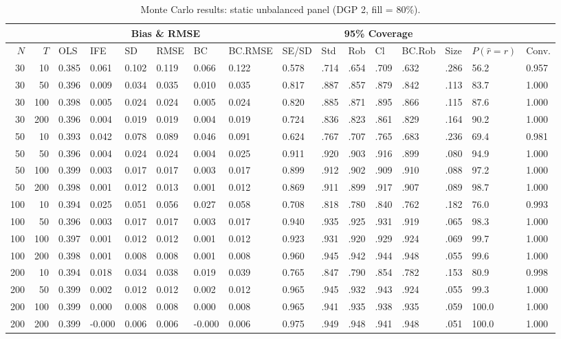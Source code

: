 \begin{table}[ht]
\centering
\caption{Monte Carlo results: static unbalanced panel (DGP 2, fill = 80\%).} 
\label{tab:mc_static_unb_f80}
\begin{tabular}{rrllllllllllllll}
  \hline
 & & \multicolumn{6}{c}{Bias \& RMSE} & & \multicolumn{4}{c}{95\% Coverage} & & & \\
\cline{3-8}\cline{10-13}
 \hline
$N$ & $T$ & OLS & IFE & SD & RMSE & BC & BC.RMSE & SE/SD & Std & Rob & Cl & BC.Rob & Size & $P(\hat r=r)$ & Conv. \\ 
  \hline
30 & 10 & 0.385 & 0.061 & 0.102 & 0.119 & 0.066 & 0.122 & 0.578 & .714 & .654 & .709 & .632 & .286 & 56.2 & 0.957 \\ 
  30 & 50 & 0.396 & 0.009 & 0.034 & 0.035 & 0.010 & 0.035 & 0.817 & .887 & .857 & .879 & .842 & .113 & 83.7 & 1.000 \\ 
  30 & 100 & 0.398 & 0.005 & 0.024 & 0.024 & 0.005 & 0.024 & 0.820 & .885 & .871 & .895 & .866 & .115 & 87.6 & 1.000 \\ 
  30 & 200 & 0.396 & 0.004 & 0.019 & 0.019 & 0.004 & 0.019 & 0.724 & .836 & .823 & .861 & .829 & .164 & 90.2 & 1.000 \\ 
  50 & 10 & 0.393 & 0.042 & 0.078 & 0.089 & 0.046 & 0.091 & 0.624 & .767 & .707 & .765 & .683 & .236 & 69.4 & 0.981 \\ 
  50 & 50 & 0.396 & 0.004 & 0.024 & 0.024 & 0.004 & 0.025 & 0.911 & .920 & .903 & .916 & .899 & .080 & 94.9 & 1.000 \\ 
  50 & 100 & 0.399 & 0.003 & 0.017 & 0.017 & 0.003 & 0.017 & 0.899 & .912 & .902 & .909 & .910 & .088 & 97.2 & 1.000 \\ 
  50 & 200 & 0.398 & 0.001 & 0.012 & 0.013 & 0.001 & 0.012 & 0.869 & .911 & .899 & .917 & .907 & .089 & 98.7 & 1.000 \\ 
  100 & 10 & 0.394 & 0.025 & 0.051 & 0.056 & 0.027 & 0.058 & 0.708 & .818 & .780 & .840 & .762 & .182 & 76.0 & 0.993 \\ 
  100 & 50 & 0.396 & 0.003 & 0.017 & 0.017 & 0.003 & 0.017 & 0.940 & .935 & .925 & .931 & .919 & .065 & 98.3 & 1.000 \\ 
  100 & 100 & 0.397 & 0.001 & 0.012 & 0.012 & 0.001 & 0.012 & 0.923 & .931 & .920 & .929 & .924 & .069 & 99.7 & 1.000 \\ 
  100 & 200 & 0.398 & 0.001 & 0.008 & 0.008 & 0.001 & 0.008 & 0.960 & .945 & .942 & .944 & .948 & .055 & 99.6 & 1.000 \\ 
  200 & 10 & 0.394 & 0.018 & 0.034 & 0.038 & 0.019 & 0.039 & 0.765 & .847 & .790 & .854 & .782 & .153 & 80.9 & 0.998 \\ 
  200 & 50 & 0.399 & 0.002 & 0.012 & 0.012 & 0.002 & 0.012 & 0.965 & .945 & .932 & .943 & .924 & .055 & 99.3 & 1.000 \\ 
  200 & 100 & 0.399 & 0.000 & 0.008 & 0.008 & 0.000 & 0.008 & 0.965 & .941 & .935 & .938 & .935 & .059 & 100.0 & 1.000 \\ 
  200 & 200 & 0.399 & -0.000 & 0.006 & 0.006 & -0.000 & 0.006 & 0.975 & .949 & .948 & .941 & .948 & .051 & 100.0 & 1.000 \\ 
   \hline
\end{tabular}
\end{table}
